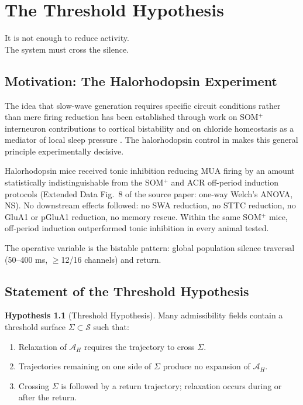 \documentclass[12pt, a4paper, twoside]{book}
\theoremstyle{definition}
\newtheorem{hypothesis}{Hypothesis}[chapter]
\theoremstyle{remark}
\newcommand{\Adm}{\mathcal{A}}
\newcommand{\Spc}{\mathcal{S}}
\begin{document}
\chapter{The Threshold Hypothesis}
\label{ch:threshold}

\epigraph{It is not enough to reduce activity.\\
  The system must cross the silence.}{}

\section{Motivation: The Halorhodopsin Experiment}

The idea that slow-wave generation requires specific circuit conditions rather than mere firing reduction has been established through work on SOM$^+$ interneuron contributions to cortical bistability \citep{funk2017} and on chloride homeostasis as a mediator of local sleep pressure \citep{alfonsa2023}. The halorhodopsin control in \citet{driessen2026} makes this general principle experimentally decisive.

Halorhodopsin mice received tonic inhibition reducing MUA firing by an amount statistically indistinguishable from the SOM$^+$ and ACR off-period induction protocols (Extended Data Fig.\ 8 of the source paper: one-way Welch's ANOVA, NS). No downstream effects followed: no SWA reduction, no STTC reduction, no GluA1 or pGluA1 reduction, no memory rescue. Within the same SOM$^+$ mice, off-period induction outperformed tonic inhibition in every animal tested.

The operative variable is the bistable pattern: global population silence traversal (50--400 ms, $\geq$12/16 channels) and return.

\section{Statement of the Threshold Hypothesis}

\begin{hypothesis}[Threshold Hypothesis]
\label{hyp:threshold}
Many admissibility fields contain a threshold surface $\Sigma \subset \Spc$ such that:
\begin{enumerate}
  \item Relaxation of $\Adm_H$ requires the trajectory to cross $\Sigma$.
  \item Trajectories remaining on one side of $\Sigma$ produce no expansion of $\Adm_H$.
  \item Crossing $\Sigma$ is followed by a return trajectory; relaxation occurs during or after the return.
\end{enumerate}
\end{hypothesis}
\end{document}
